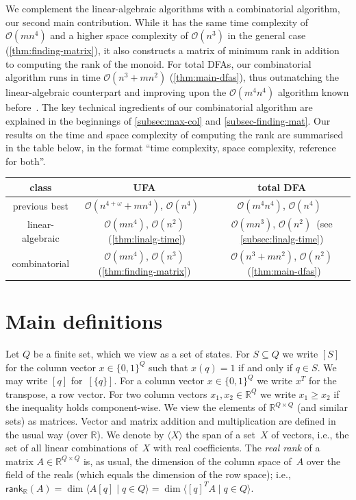 \documentclass[11pt,a4paper]{amsart}
\newcommand{\OO}{\mathcal{O}}
\newcommand{\rkr}{\mathsf{rank}_{\mathbb{R}}}
\newcommand{\spn}[1]{\mathord{\langle #1 \rangle}}
\theoremstyle{plain}
\theoremstyle{definition}
\theoremstyle{defC}
\theoremstyle{thmC}
\theoremstyle{plain}
\numberwithin{equation}{section}
\begin{document}
We complement the linear-algebraic algorithms with a combinatorial algorithm, our second main contribution. While it has the same time complexity of  $\OO(mn^4)$ and a higher space complexity of $\OO(n^3)$ in the general case (\autoref{thm:finding-matrix}), it also constructs a matrix of minimum rank in addition to computing the rank of the monoid. For total DFAs, our combinatorial algorithm runs in time $\OO(n^3 + mn^2)$ (\autoref{thm:main-dfas}), thus outmatching the linear-algebraic counterpart and improving upon the $\OO(m^4n^4)$ algorithm known before~\cite{Rystsov1992Rank}. The key technical ingredients of our combinatorial algorithm are explained in the beginnings of \autoref{subsec:max-col} and \autoref{subsec-finding-mat}.
Our results on the time and space complexity of computing the rank are summarised in the table below, in the format ``time complexity, space complexity, reference for both''.

\begin{center}
\begin{tabular}{ccc}
  \toprule
  class & UFA & total DFA \\
  \midrule
  previous best & $\OO(n^{4 + \omega} + mn^4)$, $\OO(n^4)$~\cite{Carpi1988} & $\OO(m^4n^4)$, $\OO(n^4)$~\cite{Rystsov1992Rank} \\
  linear-algebraic & $\OO(mn^4)$,  $\OO(n^2)$~(\autoref{thm:linalg-time}) & $\OO(mn^3)$, $\OO(n^2)$~(see \autoref{subsec:linalg-time}) \\
  combinatorial & $\OO( mn^4)$, $\OO(n^3)$ (\autoref{thm:finding-matrix}) & $\OO(n^3 + mn^2)$, $\OO(n^2)$~(\autoref{thm:main-dfas}) \\
  \bottomrule
\end{tabular}
\end{center}

\section{Main definitions}\label{sec-definitions}
Let $Q$ be a finite set, which we view as a set of states.
For $S \subseteq Q$ we write $[S]$ for the column vector $x \in \{0,1\}^Q$ such that $x(q) = 1$ if and only if $q \in S$.
We may write $[q]$ for~$[\{q\}]$.
For a column vector $x \in \{0,1\}^Q$ we write $x^T$ for the transpose, a row vector.
For two column vectors $x_1,x_2 \in \mathbb{R}^Q$ we write $x_1 \ge x_2$ if the inequality holds component-wise.
We view the elements of $\mathbb{R}^{Q \times Q}$ (and similar sets) as matrices.
Vector and matrix addition and multiplication are defined in the usual way (over $\mathbb{R}$).
We denote by $\spn{X}$ the span of a set~$X$ of vectors, i.e., the set of all linear combinations of~$X$ with real coefficients.
The \emph{real rank} of a matrix $A \in \mathbb{R}^{Q \times Q}$ is, as usual, the dimension of the column space of~$A$ over the field of the reals (which equals the dimension of the row space); i.e., $\rkr(A) = \dim \spn{A [q] \mid q \in Q} = \dim \spn{[q]^T A \mid q \in Q}$.
\end{document}
